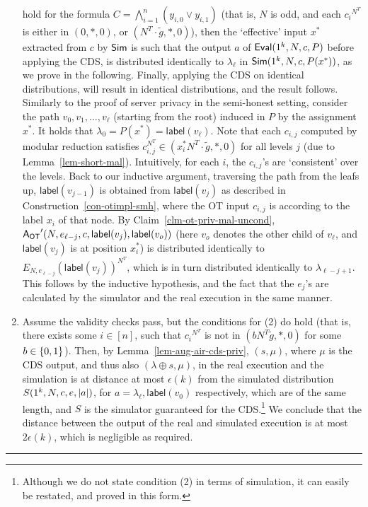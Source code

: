 \documentclass[11pt]{article}
\newenvironment{proof}{\noindent {\bf Proof:} \hspace{.677em}}%
                     {\qed}
\newcommand{\qed}{\hspace*{\fill}\rule{0.6em}{0.6em}}
\newcommand{\eps}{{\epsilon}}
\newcommand{\lab}{{\mathsf{label}}}
\newcommand{\eval}{{\sf Eval}}
\renewcommand{\sim}{{\sf Sim}}
\newcommand{\ansot}{{\sf A_{OT}}}
\newcommand\ot{\mbox{OT}\xspace}
\newcommand{\encr}[2]{E_{#1}(#2)}
\newcommand{\mathify}[1]{\ifmmode{#1}\else\mbox{$#1$}\fi}
\newcommand{\set}[2][]{\mathify{{\left\{#2\right\}}^{#1}}}
\newcommand{\bools}[1][]{\set[#1]{0,1}}
\newcommand{\size}[1]{\mathify{\left| #1 \right|}}
\begin{document}
\begin{proof}
\begin{enumerate}
    hold for the formula $C=\bigwedge^n_{i=1}(y_{i,0}\vee y_{i,1})$
    (that is, $N$ is odd, and each ${c_i}^{N^T}$ is either in $(0,*,0)$, or $(N^T\cdot \tilde{g},*,0)$), then the `effective' input $x^*$ extracted from $c$ by $\sim$ is such that the output $a$ of $\eval(1^k,N,c,P)$ before applying the CDS, is distributed identically to $\lambda_{\ell}$ in $\sim(1^k,N,c,P(x^*))$, as we prove in the following. Finally, applying the CDS on identical distributions, will result in identical distributions, and the result follows. Similarly to the proof of server privacy in the semi-honest setting, consider the path $v_0,v_1,\ldots,v_\ell$ (starting from the root) induced in $P$ by the assignment $x^*$. It holds that $\lambda_0=P(x^*)=\lab(v_\ell)$.
    Note that each $c_{i,j}$ computed by modular reduction satisfies $c^{N^T}_{i,j}\in(x^*_iN^T\cdot \tilde{g},*,0)$
    for all levels $j$ (due to Lemma~\ref{lem-short-mal}). Intuitively, for each $i$, the $c_{i,j}$'s are `consistent' over the levels. Back to our inductive argument, traversing the path from the leafs up,
    $\lab(v_{j-1})$ is obtained from $\lab(v_j)$ as described in Construction~\ref{con-otimpl-smh},
    where the \ot input $c_{i,j}$ is according to the label $x_i$ of that node.
    By Claim~\ref{clm-ot-priv-mal-uncond}, $\ansot'(N,e_{\ell-j},c,\lab(v_j),\lab(v_o))$ (here $v_o$ denotes
    the other child of $v_{\ell}$, and $\lab(v_j)$ is at position $x^*_i$) is distributed identically
    to $\encr{N,e_{\ell-j}}{\lab(v_j)}^{N^T}$, which is in turn distributed identically to
    $\lambda_{\ell-j+1}$.
    This follows by the inductive hypothesis, and the fact that the $e_j$'s are calculated by the simulator and the real execution in the same manner.
    \item Assume the validity checks pass, but the conditions for (2) do hold (that is, there exists some $i\in[n]$, such that ${c_i}^{N^T}$ is not in $(bN^T\tilde{g},*,0)$ for some $b\in\bools$). Then, by Lemma~\ref{lem-aug-air-cds-priv}, $(s,\mu)$, where $\mu$ is the CDS
    output, and thus also $(\lambda\oplus s,\mu)$, in the real execution and the simulation is at distance at most $\eps(k)$ from the simulated distribution
    $S(1^k,N,c,e,\size{a})$, for $a=\lambda_\ell,\lab(v_0)$ respectively, which are of the same length, and $S$ is the simulator guaranteed for the CDS.\footnote{Although we do not state condition (2) in terms of simulation, it can easily be restated, and proved in this form.} We conclude that the distance between the output of the real and simulated execution is at most $2\eps(k)$, which is negligible as required. 
  \end{enumerate}
\end{proof}
\end{document}
